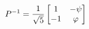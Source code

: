 \documentclass[preview]{standalone}
\begin{document}
\begin{align*}
\special{dvisvgm:raw <g id='unique000'>}P^{-1} = \frac{1}{\sqrt{5}}\begin{bmatrix} 1 & -\psi \\ -1 & \varphi \end{bmatrix}\special{dvisvgm:raw </g>}
\end{align*}
\end{document}
